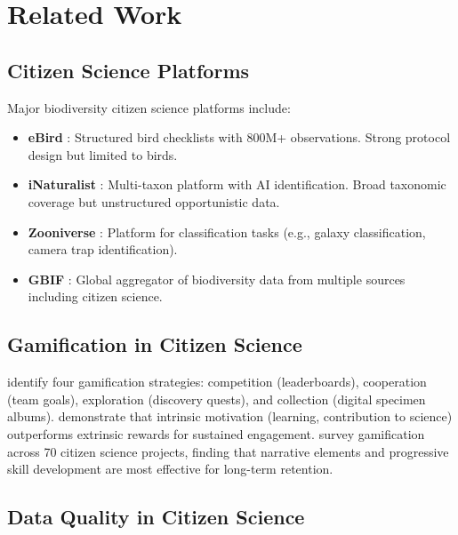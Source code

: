 \section{Related Work}

\label{sec:related}

\subsection{Citizen Science Platforms}

Major biodiversity citizen science platforms include:
\begin{itemize}
  \item \textbf{eBird} \citep{sullivan2014ebird}: Structured bird
    checklists with 800M+ observations. Strong protocol design but
    limited to birds.
  \item \textbf{iNaturalist} \citep{inaturalist2024}: Multi-taxon
    platform with AI identification. Broad taxonomic coverage but
    unstructured opportunistic data.
  \item \textbf{Zooniverse} \citep{simpson2014zooniverse}: Platform
    for classification tasks (e.g., galaxy classification, camera
    trap identification).
  \item \textbf{GBIF} \citep{gbif2024}: Global aggregator of
    biodiversity data from multiple sources including citizen science.
\end{itemize}

\subsection{Gamification in Citizen Science}

\citet{bowser2013gamifying} identify four gamification strategies:
competition (leaderboards), cooperation (team goals), exploration
(discovery quests), and collection (digital specimen albums).
\citet{eveleigh2014designing} demonstrate that intrinsic motivation
(learning, contribution to science) outperforms extrinsic rewards for
sustained engagement. \citet{preece2019citizen} survey
gamification across 70 citizen science projects, finding that narrative
elements and progressive skill development are most effective for
long-term retention.

\subsection{Data Quality in Citizen Science}

